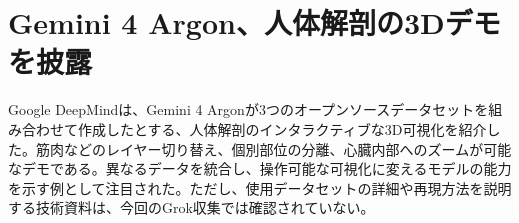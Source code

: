 \section{Gemini 4 Argon、人体解剖の3Dデモを披露}
Google DeepMindは、Gemini 4 Argonが3つのオープンソースデータセットを組み合わせて作成したとする、人体解剖のインタラクティブな3D可視化を紹介した。筋肉などのレイヤー切り替え、個別部位の分離、心臓内部へのズームが可能なデモである。異なるデータを統合し、操作可能な可視化に変えるモデルの能力を示す例として注目された。ただし、使用データセットの詳細や再現方法を説明する技術資料は、今回のGrok収集では確認されていない。
